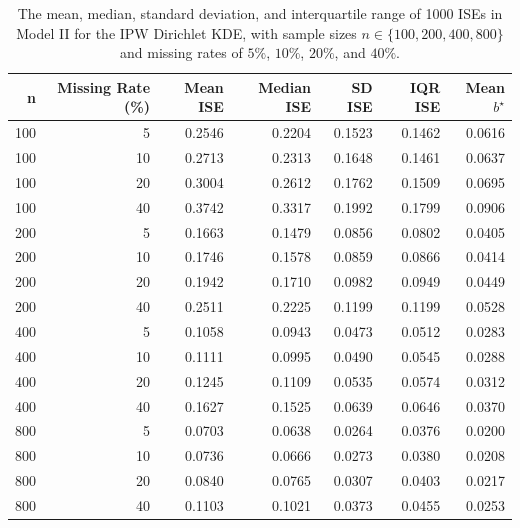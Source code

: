\begin{table}[H]
\renewcommand{\arraystretch}{1.1}
\centering
\begin{tabular}{rrrrrrr}
\hline
n & Missing Rate (\%) & Mean ISE & Median ISE & SD ISE & IQR ISE & Mean $b^{\star}$ \\
\hline
100 & 5 & 0.2546 & 0.2204 & 0.1523 & 0.1462 & 0.0616 \\
100 & 10 & 0.2713 & 0.2313 & 0.1648 & 0.1461 & 0.0637 \\
100 & 20 & 0.3004 & 0.2612 & 0.1762 & 0.1509 & 0.0695 \\
100 & 40 & 0.3742 & 0.3317 & 0.1992 & 0.1799 & 0.0906 \\
200 & 5 & 0.1663 & 0.1479 & 0.0856 & 0.0802 & 0.0405 \\
200 & 10 & 0.1746 & 0.1578 & 0.0859 & 0.0866 & 0.0414 \\
200 & 20 & 0.1942 & 0.1710 & 0.0982 & 0.0949 & 0.0449 \\
200 & 40 & 0.2511 & 0.2225 & 0.1199 & 0.1199 & 0.0528 \\
400 & 5 & 0.1058 & 0.0943 & 0.0473 & 0.0512 & 0.0283 \\
400 & 10 & 0.1111 & 0.0995 & 0.0490 & 0.0545 & 0.0288 \\
400 & 20 & 0.1245 & 0.1109 & 0.0535 & 0.0574 & 0.0312 \\
400 & 40 & 0.1627 & 0.1525 & 0.0639 & 0.0646 & 0.0370 \\
800 & 5 & 0.0703 & 0.0638 & 0.0264 & 0.0376 & 0.0200 \\
800 & 10 & 0.0736 & 0.0666 & 0.0273 & 0.0380 & 0.0208 \\
800 & 20 & 0.0840 & 0.0765 & 0.0307 & 0.0403 & 0.0217 \\
800 & 40 & 0.1103 & 0.1021 & 0.0373 & 0.0455 & 0.0253 \\
\hline
\end{tabular}
\caption{The mean, median, standard deviation, and interquartile range of 1000 ISEs in Model II for the IPW Dirichlet KDE, with sample sizes $n\in \{100, 200, 400, 800\}$ and missing rates of $5\%$, $10\%$, $20\%$, and $40\%$.}
\label{tab:results_LSCV_Model2}
\end{table}

